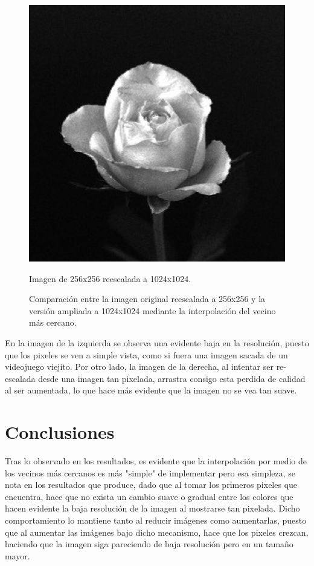 \documentclass[11pt, letterpaper]{article}
\begin{document}
\begin{figure}[h]
\begin{minipage}{0.45\textwidth}
			\includegraphics[width=\textwidth]{IMG/v2.jpg}
			\caption{Imagen de 256x256 reescalada a 1024x1024.}
			\label{fig:b2}
		\end{minipage}
		\caption{Comparación entre la imagen original reescalada a 256x256 y la versión ampliada a 1024x1024 mediante la interpolación del vecino más cercano.}
		\label{fig:comparacion}
	\end{figure}
	
	En la imagen de la izquierda se observa una evidente baja en la resolución, puesto que los pixeles se ven a simple vista, como si fuera una imagen sacada de un videojuego viejito. Por otro lado, la imagen de la derecha, al intentar ser re-escalada desde una imagen tan pixelada, arrastra consigo esta perdida de calidad al ser aumentada, lo que hace más evidente que la imagen no se vea tan suave.
	

	\newpage

	
	\section{Conclusiones}
	
	Tras lo observado en los resultados, es evidente que la interpolación por medio de los vecinos más cercanos es más "simple" de implementar pero esa simpleza, se nota en los resultados que produce, dado que al tomar los primeros pixeles que encuentra, hace que no exista un cambio suave o gradual entre los colores que hacen evidente la baja resolución de la imagen al mostrarse tan pixelada. Dicho comportamiento lo mantiene tanto al reducir imágenes como aumentarlas, puesto que al aumentar las imágenes bajo dicho mecanismo, hace que los pixeles crezcan, haciendo que la imagen siga pareciendo de baja resolución pero en un tamaño mayor.
	
\end{document}
